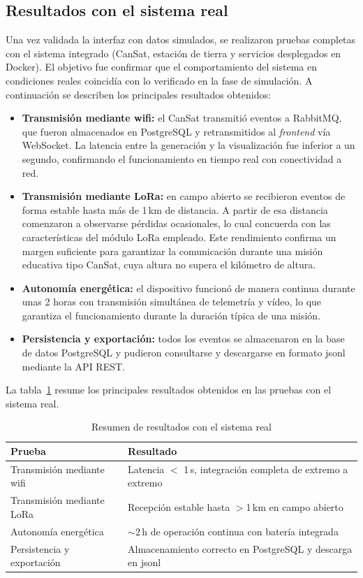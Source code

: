 \subsection*{Resultados con el sistema real}

Una vez validada la interfaz con datos simulados, se realizaron pruebas completas con
el sistema integrado (CanSat, estación de tierra y servicios desplegados en Docker).
El objetivo fue confirmar que el comportamiento del sistema en condiciones reales
coincidía con lo verificado en la fase de simulación. A continuación se describen los
principales resultados obtenidos:

\begin{itemize}
  \item \textbf{Transmisión mediante wifi:} el CanSat transmitió eventos a RabbitMQ, que fueron
  almacenados en PostgreSQL y retransmitidos al \emph{frontend} vía WebSocket. La latencia
  entre la generación y la visualización fue inferior a un segundo, confirmando el
  funcionamiento en tiempo real con conectividad a red.

  \item \textbf{Transmisión mediante LoRa:} en campo abierto se recibieron eventos de forma estable hasta más de 1\,km de distancia. A partir de esa distancia comenzaron a observarse pérdidas ocasionales, lo cual concuerda con las características del módulo LoRa empleado. Este rendimiento confirma un margen suficiente para garantizar la comunicación durante una misión educativa tipo CanSat,  cuya altura no supera el kilómetro de altura.

  \item \textbf{Autonomía energética:} el dispositivo funcionó de manera continua durante unas 2 horas con transmisión simultánea de telemetría y vídeo, lo que garantiza el funcionamiento durante la duración típica de una misión.

  \item \textbf{Persistencia y exportación:} todos los eventos se almacenaron en la base de
  datos PostgreSQL y pudieron consultarse y descargarse en formato jsonl mediante
  la API REST.
\end{itemize}
La tabla~\ref{tab:resultados-reales} resume los principales resultados obtenidos en las pruebas con el sistema real.
\begin{table}[H]
\centering
\footnotesize
\renewcommand{\arraystretch}{1.2}
\begin{tabular}{|l|p{9cm}|}
\hline
\textbf{Prueba} & \textbf{Resultado} \\
\hline
Transmisión mediante wifi & Latencia $<$ 1\,s, integración completa de extremo a extremo \\
\hline
Transmisión mediante LoRa & Recepción estable hasta $>$1\,km en campo abierto \\
\hline
Autonomía energética & $\sim$2\,h de operación continua con batería integrada \\
\hline
Persistencia y exportación & Almacenamiento correcto en PostgreSQL y descarga en jsonl \\
\hline
\end{tabular}
\caption{Resumen de resultados con el sistema real}
\label{tab:resultados-reales}
\end{table}